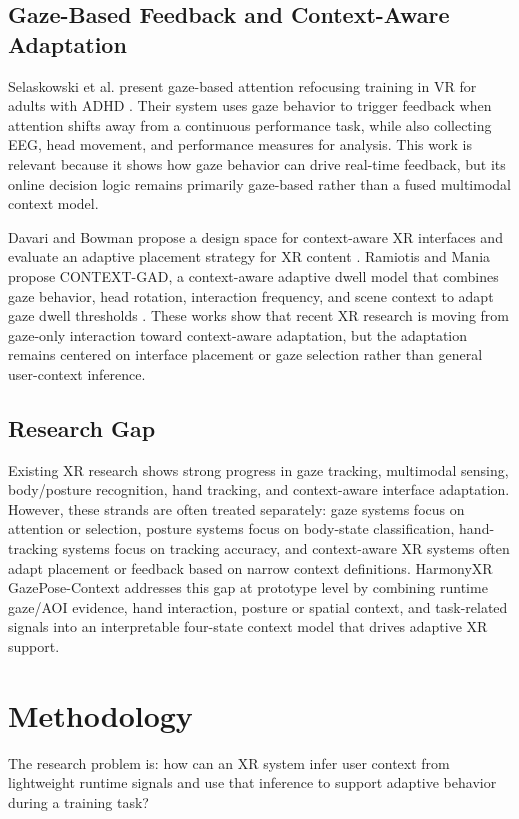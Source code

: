 \documentclass[conference]{IEEEtran}
\begin{document}
\subsection{Gaze-Based Feedback and Context-Aware Adaptation}
Selaskowski et al. present gaze-based attention refocusing training in VR for adults with ADHD \cite{selaskowski2023gaze}. Their system uses gaze behavior to trigger feedback when attention shifts away from a continuous performance task, while also collecting EEG, head movement, and performance measures for analysis. This work is relevant because it shows how gaze behavior can drive real-time feedback, but its online decision logic remains primarily gaze-based rather than a fused multimodal context model.

Davari and Bowman propose a design space for context-aware XR interfaces and evaluate an adaptive placement strategy for XR content \cite{davari2024context}. Ramiotis and Mania propose CONTEXT-GAD, a context-aware adaptive dwell model that combines gaze behavior, head rotation, interaction frequency, and scene context to adapt gaze dwell thresholds \cite{ramiotis2025contextgad}. These works show that recent XR research is moving from gaze-only interaction toward context-aware adaptation, but the adaptation remains centered on interface placement or gaze selection rather than general user-context inference.

\subsection{Research Gap}
Existing XR research shows strong progress in gaze tracking, multimodal sensing, body/posture recognition, hand tracking, and context-aware interface adaptation. However, these strands are often treated separately: gaze systems focus on attention or selection, posture systems focus on body-state classification, hand-tracking systems focus on tracking accuracy, and context-aware XR systems often adapt placement or feedback based on narrow context definitions. HarmonyXR GazePose-Context addresses this gap at prototype level by combining runtime gaze/AOI evidence, hand interaction, posture or spatial context, and task-related signals into an interpretable four-state context model that drives adaptive XR support.

\section{Methodology}
The research problem is: how can an XR system infer user context from lightweight runtime signals and use that inference to support adaptive behavior during a training task?
\end{document}
